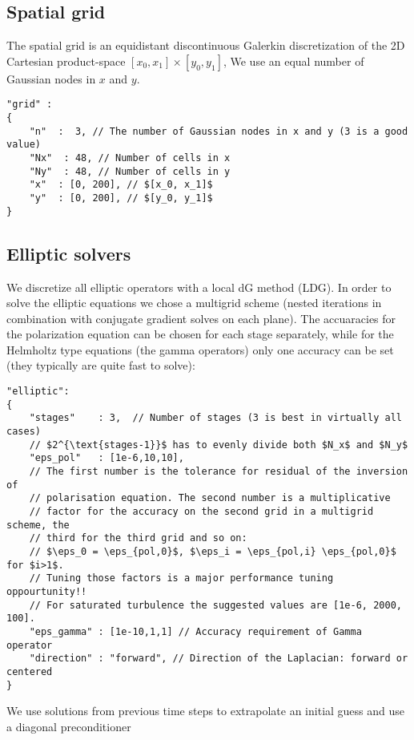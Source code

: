 \subsection{Spatial grid} \label{sec:spatial}
The spatial grid is an equidistant discontinuous Galerkin discretization of the
2D Cartesian product-space
$[ x_0, x_1]\times [y_0, y_1]$,
We use an equal number of Gaussian nodes in $x$ and $y$.
\begin{verbatim}
"grid" :
{
    "n"  :  3, // The number of Gaussian nodes in x and y (3 is a good value)
    "Nx"  : 48, // Number of cells in x
    "Ny"  : 48, // Number of cells in y
    "x"  : [0, 200], // $[x_0, x_1]$
    "y"  : [0, 200], // $[y_0, y_1]$
}
\end{verbatim}
\subsection{Elliptic solvers}
We discretize all elliptic operators with a local dG method (LDG).  In order to
solve the elliptic equations we chose a multigrid scheme (nested iterations in
combination with conjugate gradient solves on each plane). The accuaracies for
the polarization equation can be chosen for each stage separately, while for
the Helmholtz type equations (the gamma operators) only
one accuracy can be set (they typically are quite fast to solve):
\begin{verbatim}
"elliptic":
{
    "stages"    : 3,  // Number of stages (3 is best in virtually all cases)
    // $2^{\text{stages-1}}$ has to evenly divide both $N_x$ and $N_y$
    "eps_pol"   : [1e-6,10,10],
    // The first number is the tolerance for residual of the inversion of
    // polarisation equation. The second number is a multiplicative
    // factor for the accuracy on the second grid in a multigrid scheme, the
    // third for the third grid and so on:
    // $\eps_0 = \eps_{pol,0}$, $\eps_i = \eps_{pol,i} \eps_{pol,0}$  for $i>1$.
    // Tuning those factors is a major performance tuning oppourtunity!!
    // For saturated turbulence the suggested values are [1e-6, 2000, 100].
    "eps_gamma" : [1e-10,1,1] // Accuracy requirement of Gamma operator
    "direction" : "forward", // Direction of the Laplacian: forward or centered
}
\end{verbatim}
\begin{tcolorbox}[title=Note]
    We use solutions from previous time steps to extrapolate an initial guess
    and use a diagonal preconditioner
\end{tcolorbox}
